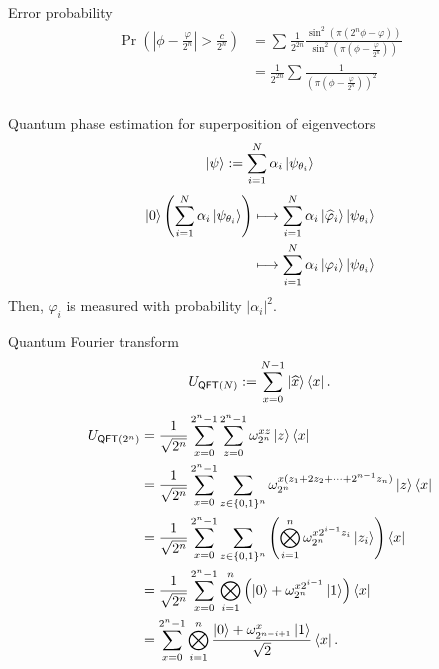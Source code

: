 \documentclass{beamer}
\newcommand\emm[1]{\textcolor{redorange}{{#1}}}
\begin{document}
\begin{frame}{Error probability}
\begin{align*}
\Pr\left(\left|\phi - \frac{\varphi}{2^n}\right| > \frac{c}{2^n}\right)
&=\sum_{} \frac1{2^{2n}}\frac{\sin^2\left(\pi\left(2^n\phi - \varphi\right)\right)}{\sin^2\left(\pi\left(\phi - \frac{\varphi}{2^n}\right)\right)}\\
&= \frac1{2^{2n}}\sum_{}\frac{1}{\left(\pi\left(\phi - \frac{\varphi}{2^n}\right)\right)^2}\\
\end{align*}
\end{frame}
\fi

\begin{frame}{Quantum phase estimation for superposition of eigenvectors}
\begin{align*}
\ket{\psi} := \sum_{i=1}^N \alpha_i \ket{\psi_{\theta_i}}
\end{align*}
\begin{align*}
\ket{0}\left(\sum_{i=1}^N \alpha_i \ket{\psi_{\theta_i}}\right)
&\longmapsto \sum_{i=1}^N \alpha_i \ket{\widehat{\varphi}_i}\ket{\psi_{\theta_i}}\\
&\longmapsto \sum_{i=1}^N \alpha_i \ket{\varphi_i}\ket{\psi_{\theta_i}}
\end{align*}
Then, \emm{$\varphi_i$} is measured with probability $|\alpha_i|^2$.
\end{frame}

\begin{frame}{Quantum Fourier transform}
\small
\vspace{-1em}
\begin{align*}
U_{\mathsf{QFT}(N)} := \sum_{x=0}^{N-1}\ket{\widehat{x}}\bra{x}.
\end{align*}
\begin{align*}
U_{\mathsf{QFT}(2^n)} &= \frac1{\sqrt{2^{n}}}\sum_{x=0}^{2^n-1}\sum_{z=0}^{2^n-1}\omega_{2^n}^{xz}\ket{z}\bra{x}\\
&= \frac1{\sqrt{2^{n}}}\sum_{x=0}^{2^n-1}\sum_{z\in\{0,1\}^n}\omega_{2^n}^{x(z_1+2z_2+\dotsb +2^{n-1}z_n)}\ket{z}\bra{x}\\
&= \frac1{\sqrt{2^{n}}}\sum_{x=0}^{2^n-1}\sum_{z\in\{0,1\}^n}\left(\bigotimes_{i=1}^n\omega_{2^n}^{x2^{i-1}z_i}\ket{z_i}\right)\bra{x}\\
&= \frac1{\sqrt{2^{n}}}\sum_{x=0}^{2^n-1}\bigotimes_{i=1}^n \left(\ket{0} + \omega_{2^n}^{x2^{i-1}}\ket{1}\right)\bra{x}\\
&= \sum_{x=0}^{2^n-1}\bigotimes_{i=1}^n \frac{\ket{0} + \omega_{2^{n-i+1}}^{x}\ket{1}}{\sqrt{2}}\bra{x}.
\end{align*}
\end{frame}
\fi
\end{document}

